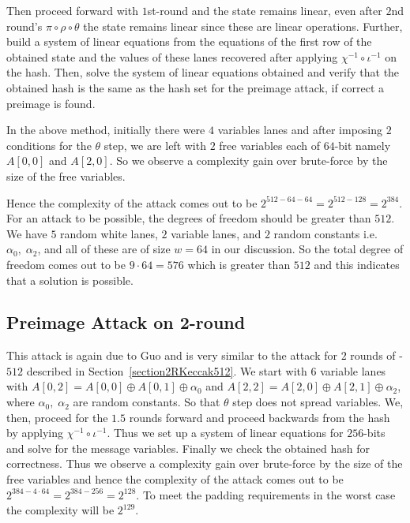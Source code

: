 Then proceed forward with $1$st-round and the state remains linear, even after $2$nd round's $\pi \circ \rho \circ \theta$ the state remains linear since these are linear operations.
Further, build a system of linear equations from the equations of the first row of the obtained state and the values of these lanes recovered after applying $\chi^{-1} \circ \iota^{-1}$ on the hash. Then, solve the system of linear equations obtained and verify that the obtained hash is the same as the hash set for the preimage attack, if correct a preimage is found.
        
In the above method, initially there were $4$ variables lanes and after imposing $2$ conditions for the $\theta$ step, we are left with $2$ free variables each of $64$-bit namely $A[0,0]$ and $A[2, 0]$. So we observe a complexity gain over brute-force by the size of the free variables.

Hence the complexity of the attack comes out to be $2^{512 - 64 - 64} = 2^{512 - 128} = 2^{384}$. For an attack to be possible, the degrees of freedom should be greater than $512$. We have $5$ random white lanes, $2$ variable lanes, and $2$ random constants i.e. $\alpha_{0},\; \alpha_{2}$, and all of these are of size $w = 64$ in our discussion. So the total degree of freedom comes out to be $ 9 \cdot 64 = 576$ which is greater than $512$ and this indicates that a solution is possible.

\subsection{Preimage Attack on 2-round }
\label{section2RKeccak384}
This attack is again due to Guo \etal\cite{guo2016linear} and is very similar to the attack for $2$ rounds of \KECCAK-$512$ described in Section~\ref{section2RKeccak512}. We start with $6$ variable lanes with $A[0, 2] = A[0, 0] \oplus A[0, 1] \oplus \alpha_0$ and $A[2, 2] = A[2, 0] \oplus A[2, 1] \oplus \alpha_2$, where $\alpha_{0},\; \alpha_{2}$ are random constants. So that $\theta$ step does not spread variables. We, then, proceed for the $1.5$ rounds forward and proceed backwards from the hash by applying $\chi^{-1} \circ \iota^{-1}$. Thus we set up a system of linear equations for $256$-bits and solve for the message variables.
 Finally we check the obtained hash for correctness. 
 Thus we observe a complexity gain over brute-force by the size of the free variables and hence the complexity of the attack comes out to be $2^{384 - 4 \cdot 64} = 2^{384 - 256} = 2^{128}$. To meet the padding requirements in the worst case the complexity will be $2^{129}$.


